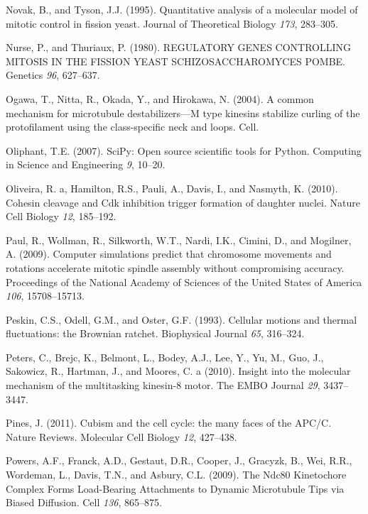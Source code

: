 \documentclass[12pt,a4paper,twoside,openright]{book}
\begin{document}
Novak, B., and Tyson, J.J. (1995). Quantitative analysis of a molecular
model of mitotic control in fission yeast. Journal of Theoretical
Biology \emph{173}, 283--305.

Nurse, P., and Thuriaux, P. (1980). REGULATORY GENES CONTROLLING MITOSIS
IN THE FISSION YEAST SCHIZOSACCHAROMYCES POMBE. Genetics \emph{96},
627--637.

Ogawa, T., Nitta, R., Okada, Y., and Hirokawa, N. (2004). A common
mechanism for microtubule destabilizers---M type kinesins stabilize
curling of the protofilament using the class-specific neck and loops.
Cell.

Oliphant, T.E. (2007). SciPy: Open source scientific tools for Python.
Computing in Science and Engineering \emph{9}, 10--20.

Oliveira, R. a, Hamilton, R.S., Pauli, A., Davis, I., and Nasmyth, K.
(2010). Cohesin cleavage and Cdk inhibition trigger formation of
daughter nuclei. Nature Cell Biology \emph{12}, 185--192.

Paul, R., Wollman, R., Silkworth, W.T., Nardi, I.K., Cimini, D., and
Mogilner, A. (2009). Computer simulations predict that chromosome
movements and rotations accelerate mitotic spindle assembly without
compromising accuracy. Proceedings of the National Academy of Sciences
of the United States of America \emph{106}, 15708--15713.

Peskin, C.S., Odell, G.M., and Oster, G.F. (1993). Cellular motions and
thermal fluctuations: the Brownian ratchet. Biophysical Journal
\emph{65}, 316--324.

Peters, C., Brejc, K., Belmont, L., Bodey, A.J., Lee, Y., Yu, M., Guo,
J., Sakowicz, R., Hartman, J., and Moores, C. a (2010). Insight into the
molecular mechanism of the multitasking kinesin-8 motor. The EMBO
Journal \emph{29}, 3437--3447.

Pines, J. (2011). Cubism and the cell cycle: the many faces of the
APC/C. Nature Reviews. Molecular Cell Biology \emph{12}, 427--438.

Powers, A.F., Franck, A.D., Gestaut, D.R., Cooper, J., Gracyzk, B., Wei,
R.R., Wordeman, L., Davis, T.N., and Asbury, C.L. (2009). The Ndc80
Kinetochore Complex Forms Load-Bearing Attachments to Dynamic
Microtubule Tips via Biased Diffusion. Cell \emph{136}, 865--875.
\end{document}
